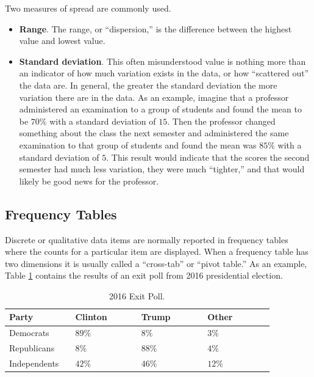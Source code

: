 Two measures of spread are commonly used. 

\begin{itemize}
	\item \textbf{Range}. The range, or ``dispersion,'' is the difference between the highest value and lowest value.
	\item \textbf{Standard deviation}. This often misunderstood value is nothing more than an indicator of how much variation exists in the data, or how ``scattered out'' the data are. In general, the greater the standard deviation the more variation there are in the data. As an example, imagine that a professor administered an examination to a group of students and found the mean to be $ 70\% $ with a standard deviation of $ 15 $. Then the professor changed something about the class the next semester and administered the same examination to that group of students and found the mean was $ 85\% $ with a standard deviation of $ 5 $. This result would indicate that the scores the second semester had much less variation, they were much ``tighter,'' and that would likely be good news for the professor.
\end{itemize}

\subsection{Frequency Tables}

Discrete or qualitative data items are normally reported in frequency tables where the counts for a particular item are displayed. When a frequency table has two dimensions it is usually called a ``cross-tab'' or ``pivot table.'' As an example, Table \ref{tab06.02} contains the results of an exit poll from 2016 presidential election. \cite{cnn2016election}

\begin{table}[H]
	\centering
	\begin{tabularx}{0.95\linewidth}{
			p{0.22\linewidth}
			p{0.22\linewidth}
			p{0.22\linewidth}
			p{0.22\linewidth}}
		\toprule
		\textbf{Party} & \textbf{Clinton} & \textbf{Trump} & \textbf{Other} \\
		\midrule
		Democrats & $ 89\% $ & $ 8\% $ & $ 3\% $ \\
		Republicans & $ 8\% $ & $ 88\% $ & $ 4\% $ \\
		Independents & $ 42\% $ & $ 46\% $ & $ 12\% $ \\
		\bottomrule
	\end{tabularx}
	\caption{2016 Exit Poll.}
	\label{tab06.02}
\end{table}

